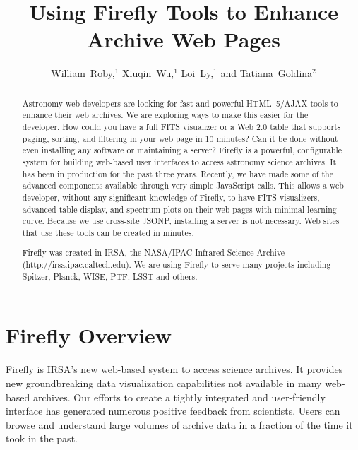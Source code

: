 
\resetcounters


\title{Using Firefly Tools to Enhance Archive Web Pages}
\author{William~Roby,$^1$ Xiuqin~Wu,$^1$ Loi~Ly,$^1$ and Tatiana~Goldina$^2$
}


\begin{abstract}
Astronomy web developers are looking for fast and powerful \newline HTML~5/AJAX tools to enhance their web archives. We are exploring ways to make this easier for the developer. How could you have a full FITS visualizer or a Web 2.0 table that supports paging, sorting, and filtering in your web page in 10 minutes? Can it be done without even installing any software or maintaining a server? Firefly is a powerful, configurable system for building web-based user interfaces to access astronomy science archives. It has been in production for the past three years. Recently, we have made some of the advanced components available through very simple JavaScript calls. This allows a web developer, without any significant knowledge of Firefly, to have FITS visualizers, advanced table display, and spectrum plots on their web pages with minimal learning curve. Because we use cross-site JSONP, installing a server is not necessary. Web sites that use these tools can be created in minutes.

Firefly was created in IRSA, the NASA/IPAC Infrared Science Archive \newline (http://irsa.ipac.caltech.edu). We are using Firefly to serve many projects including Spitzer, Planck, WISE, PTF, LSST and others. 

\end{abstract}

\section{Firefly Overview}
Firefly is IRSA's new web-based system to access science archives. It provides new groundbreaking data visualization capabilities not available in many web-based archives. Our efforts to create a tightly integrated and user-friendly interface has generated numerous positive feedback from scientists. Users can browse and understand large volumes of archive data in a fraction of the time it took in the past.


